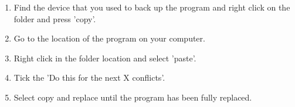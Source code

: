 \begin{enumerate}
\item Find the device that you used to back up the program and right click on the folder and press 'copy'.
\item Go to the location of the program on your computer.
\item Right click in the folder location and select 'paste'.
\item Tick the 'Do this for the next X conflicts'.
\item Select copy and replace until the program has been fully replaced.
\end{enumerate}